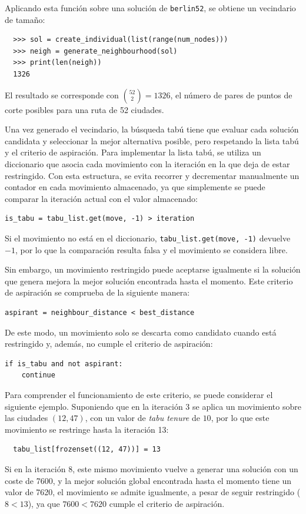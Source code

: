 Aplicando esta función sobre una solución de \texttt{berlin52}, se obtiene un vecindario de tamaño:

\begin{verbatim}
  >>> sol = create_individual(list(range(num_nodes)))
  >>> neigh = generate_neighbourhood(sol)
  >>> print(len(neigh))
  1326
\end{verbatim}

El resultado se corresponde con $\binom{52}{2} = 1326$, el número de pares de puntos de corte posibles para una ruta de 
52 ciudades.

Una vez generado el vecindario, la búsqueda tabú tiene que evaluar cada solución candidata y seleccionar la mejor 
alternativa posible, pero respetando la lista tabú y el criterio de aspiración. Para implementar la lista tabú, se utiliza 
un diccionario que asocia cada movimiento con la iteración en la que deja de estar restringido. Con esta estructura, se 
evita recorrer y decrementar manualmente un contador en cada movimiento almacenado, ya que simplemente se puede comparar la 
iteración actual con el valor almacenado:
\newline
\begin{lstlisting}[style=PythonStyle]
  is_tabu = tabu_list.get(move, -1) > iteration
\end{lstlisting}

Si el movimiento no está en el diccionario, \texttt{tabu\_list.get(move, -1)} devuelve $-1$, por lo que la comparación
resulta falsa y el movimiento se considera libre.

Sin embargo, un movimiento restringido puede aceptarse igualmente si la solución que genera mejora la mejor solución
encontrada hasta el momento. Este criterio de aspiración se comprueba de la siguiente manera:
\newline
\begin{lstlisting}[style=PythonStyle]
  aspirant = neighbour_distance < best_distance
\end{lstlisting} 

De este modo, un movimiento solo se descarta como candidato cuando está restringido y, además, no cumple el criterio de 
aspiración:
\newline
\begin{lstlisting}[style=PythonStyle]
  if is_tabu and not aspirant:
    continue
\end{lstlisting}

Para comprender el funcionamiento de este criterio, se puede considerar el siguiente ejemplo. Suponiendo que en la 
iteración 3 se aplica un movimiento sobre las ciudades $(12, 47)$, con un valor de \textit{tabu tenure} de $10$, por lo que
este movimiento se restringe hasta la iteración 13:
\begin{verbatim}
  tabu_list[frozenset((12, 47))] = 13
\end{verbatim}
Si en la iteración 8, este mismo movimiento vuelve a generar una solución con un coste de 7600, y la mejor solución 
global encontrada hasta el momento tiene un valor de 7620, el movimiento se admite igualmente, a pesar de seguir
restringido ($8 < 13$), ya que $7600 < 7620$ cumple el criterio de aspiración.

